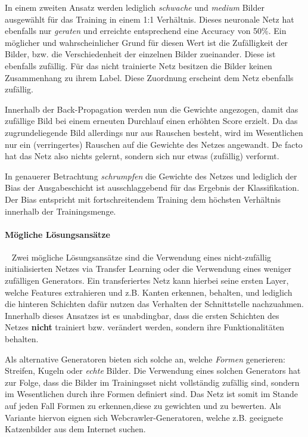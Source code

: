 In einem zweiten Ansatz werden lediglich \textit{schwache} und \textit{medium} Bilder ausgewählt für das Training in einem 1:1 Verhältnis. 
Dieses neuronale Netz hat ebenfalls nur \textit{geraten} und erreichte entsprechend eine Accuracy von 50\%. 
Ein möglicher und wahrscheinlicher Grund für diesen Wert ist die Zufälligkeit der Bilder, bzw. die Verschiedenheit der einzelnen Bilder zueinander. 
Diese ist ebenfalls zufällig. 
Für das nicht trainierte Netz besitzen die Bilder keinen Zusammenhang zu ihrem Label. 
Diese Zuordnung erscheint dem Netz ebenfalls zufällig. 

Innerhalb der Back-Propagation \cite{zhou_understanding_2018} werden nun die Gewichte angezogen, damit das zufällige Bild bei einem erneuten Durchlauf einen erhöhten Score erzielt. 
Da das zugrundeliegende Bild allerdings nur aus Rauschen besteht, wird im Wesentlichen nur ein (verringertes) Rauschen auf die Gewichte des Netzes angewandt. 
De facto hat das Netz also nichts gelernt, sondern sich nur etwas (zufällig) verformt.

In genauerer Betrachtung \textit{schrumpfen} die Gewichte des Netzes und lediglich der Bias der Ausgabeschicht ist ausschlaggebend für das Ergebnis der Klassifikation. 
Der Bias entspricht mit fortschreitendem Training dem höchsten Verhältnis innerhalb der Trainingsmenge.
\paragraph{Mögliche Lösungsansätze}~\newline
Zwei mögliche Lösungsansätze sind die Verwendung eines nicht-zufällig initialisierten Netzes via Transfer Learning \cite{5288526} oder die Verwendung eines weniger zufälligen Generators. 
Ein transferiertes Netz kann hierbei seine ersten Layer, welche Features extrahieren und z.B. Kanten erkennen, behalten, und lediglich die hinteren Schichten dafür nutzen das Verhalten der Schnittstelle nachzuahmen. 
Innerhalb dieses Ansatzes ist es unabdingbar, dass die ersten Schichten des Netzes \textbf{nicht} trainiert bzw. verändert werden, sondern ihre Funktionalitäten behalten. 

Als alternative Generatoren bieten sich solche an, welche \textit{Formen} generieren: Streifen, Kugeln oder \textit{echte} Bilder. 
Die Verwendung eines solchen Generators hat zur Folge, dass die Bilder im Trainingsset nicht vollständig zufällig sind, sondern im Wesentlichen durch ihre Formen definiert sind. 
Das Netz ist somit im Stande auf jeden Fall Formen zu erkennen,diese zu gewichten und zu bewerten. 
Als Variante hiervon eignen sich Webcrawler-Generatoren, welche z.B. geeignete Katzenbilder aus dem Internet suchen.   